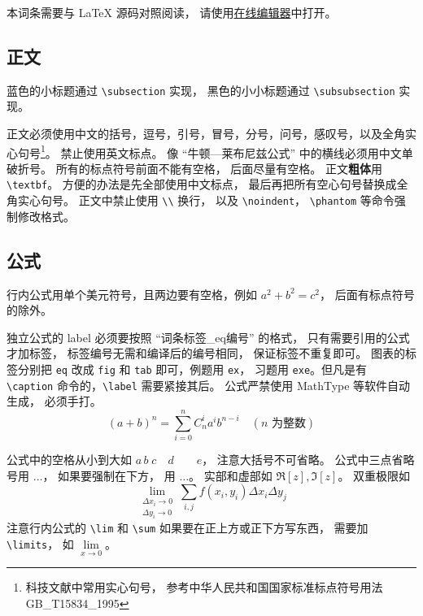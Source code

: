 

本词条需要与 LaTeX 源码对照阅读， 请使用\href{http://wuli.wiki/editor}{在线编辑器}中打开。

\subsection{正文}
蓝色的小标题通过 \lstinline|\subsection| 实现， 黑色的小小标题通过 \lstinline|\subsubsection| 实现。

正文必须使用中文的括号，逗号，引号，冒号，分号，问号，感叹号，以及全角实心句号\footnote{科技文献中常用实心句号， 参考中华人民共和国国家标准标点符号用法 GB\_T15834\_1995}。 禁止使用英文标点。 像 “牛顿—莱布尼兹公式” 中的横线必须用中文单破折号。 所有的标点符号前面不能有空格， 后面尽量有空格。 正文\textbf{粗体}用 \lstinline|\textbf|。 方便的办法是先全部使用中文标点， 最后再把所有空心句号替换成全角实心句号。 正文中禁止使用 \lstinline|\\| 换行， 以及 \lstinline|\noindent|， \lstinline|\phantom| 等命令强制修改格式。

\subsection{公式}
行内公式用单个美元符号，且两边要有空格，例如 $a^2+b^2=c^2$， 后面有标点符号的除外。

独立公式的 label 必须要按照 “词条标签\_eq编号” 的格式， 只有需要引用的公式才加标签， 标签编号无需和编译后的编号相同， 保证标签不重复即可。 图表的标签分别把 \lstinline|eq| 改成 \lstinline|fig| 和 \lstinline|tab| 即可，例题用 \lstinline|ex|， 习题用 \lstinline|exe|。但凡是有 \lstinline|\caption| 命令的，\lstinline|\label| 需要紧接其后。 公式严禁使用 MathType 等软件自动生成， 必须手打。
\begin{equation}\label{Sample_eq1}
(a+b)^n = \sum_{i=0}^n C_n^i a^i b^{n-i} \quad (\text{$n$ 为整数})
\end{equation}

公式中的空格从小到大如 $a\, b\; c\quad d\qquad e$， 注意大括号不可省略。 公式中三点省略号用 $\dots$， 如果要强制在下方， 用 $\ldots$。 实部和虚部如 $\Re[z], \Im[z]$。 双重极限如
\begin{equation}
\lim_{\substack{\Delta x_i\to 0\\ \Delta y_i\to 0}} \sum_{i, j} f(x_i,y_i) \Delta x_i \Delta y_j
\end{equation}
注意行内公式的 \lstinline|\lim| 和 \lstinline|\sum| 如果要在正上方或正下方写东西， 需要加 \lstinline|\limits|， 如 $\lim\limits_{x\to 0}$。

